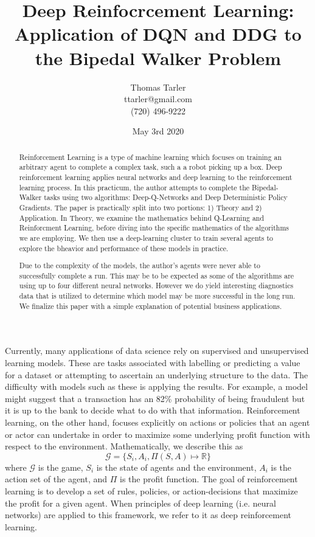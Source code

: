 \documentclass[man, 12pt]{apa6}
\title{Deep Reinfocrcement Learning: Application of DQN and DDG to the Bipedal Walker Problem}
\affiliation{Regis University}
\author{Thomas Tarler\\ ttarler@gmail.com \\ (720) 496-9222}
\date{May  3rd 2020}
\begin{document}
\maketitle

\begin{abstract}


Reinforcement Learning is a type of machine learning which focuses on training an arbitrary agent to complete a complex task, such a a robot picking up a box. Deep reinforcement learning applies neural networks and deep learning to the reinforcement learning process. In this practicum, the author attempts to complete the Bipedal-Walker tasks using two algorithms: Deep-Q-Networks and Deep Deterministic Policy Gradients. The paper is practically split into two portions: 1) Theory and 2) Application. In Theory, we examine the mathematics behind Q-Learning and Reinforcment Learning, before diving into the specific mathematics of the algorithms we are employing. We then use a deep-learning cluster to train several agents to explore the bheavior and performance of these models in practice. 

Due to the complexity of the models, the author's agents were never able to successfully complete a run. This may be to be expected as some of the algorithms are using up to four different neural networks. However we do yield interesting diagnostics data that is utilized to determine which model may be more successful in the long run. We finalize this paper with a simple explanation of potential business applications. 


\end{abstract}
\newpage
\tableofcontents
\newpage
Currently, many applications of data science rely on supervised and unsupervised learning models. These are tasks associated with labelling or predicting a value for a dataset or attempting to ascertain an underlying structure to the data. The difficulty with models such as these is applying the results. For example, a model might suggest that a transaction has an 82\% probability of being fraudulent but it is up to the bank to decide what to do with that information. Reinforcement learning, on the other hand, focuses explicitly on actions or policies that an agent or actor can undertake in order to maximize some underlying profit function with respect to the environment. Mathematically, we describe this as \[ \mathcal{G} = \lbrace S_{i}, A_{i}, \Pi(S,A) \mapsto \mathbb{R} \rbrace\] where $\mathcal{G}$ is the game, $S_{i}$ is the state of agents and the environment, $A_{i}$ is the action set of the agent, and $\Pi$ is the profit function. The goal of reinforcement learning is to develop a set of rules, policies, or action-decisions that maximize the profit for a given agent. When principles of deep learning (i.e. neural networks) are applied to this framework, we refer to it as deep reinforcement learning. 
\end{document}
